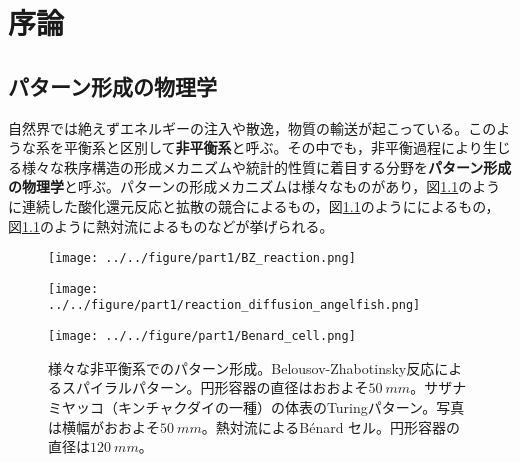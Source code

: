 \documentclass[autodetect-engine,dvi=dvipdfmx,a4paper,ja=standard,oneside,openany,11pt]{bxjsbook}
\begin{document}
\chapter{序論}
\section{パターン形成の物理学}
自然界では絶えずエネルギーの注入や散逸，物質の輸送が起こっている。このような系を平衡系と区別して\textbf{非平衡系}と呼ぶ。その中でも，非平衡過程により生じる様々な秩序構造の形成メカニズムや統計的性質に着目する分野を\textbf{パターン形成の物理学}と呼ぶ。パターンの形成メカニズムは様々なものがあり，図\ref{fig:pattern_formation}のように連続した酸化還元反応と拡散の競合によるもの，図\ref{fig:pattern_formation}のようにによるもの，図\ref{fig:pattern_formation}のように熱対流によるものなどが挙げられる。

\begin{figure}[htbp]
  \centering
  \begin{minipage}
    {0.32\textwidth}
    \subcaption{}
    \centering
    \texttt{[image: ../../figure/part1/BZ\_reaction.png]}
    \label{fig:BZ}
  \end{minipage}
  \begin{minipage}
    {0.32\textwidth}
    \subcaption{}
    \centering
    \texttt{[image: ../../figure/part1/reaction\_diffusion\_angelfish.png]}
    \label{fig:reaction_diffusion_angelfish}
  \end{minipage}
  \begin{minipage}
    {0.32\textwidth}
    \subcaption{}
    \centering
    \texttt{[image: ../../figure/part1/Benard\_cell.png]}
    \label{fig:Benard_cell}
  \end{minipage}
  \caption{様々な非平衡系でのパターン形成。Belousov-Zhabotinsky反応によるスパイラルパターン\cite{BZ_reaction}。円形容器の直径はおおよそ$\SI{50}{mm}$。サザナミヤッコ（キンチャクダイの一種）の体表のTuringパターン。写真は横幅がおおよそ$\SI{50}{mm}$\cite{kondo1995reaction}。熱対流によるB{\'e}nard セル。円形容器の直径は$\SI{120}{mm}${\cite{eckert1998square}}。}
  \label{fig:pattern_formation}
\end{figure}
\end{document}
